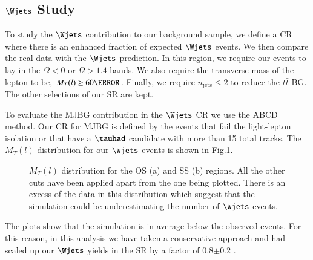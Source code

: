 \subsection{$\Wjets$ Study}\label{wjetsstudy}
To study the $\Wjets$ contribution to our background sample, we define a CR where there is an enhanced fraction of expected $\Wjets$ events. We then compare the real data with the  $\Wjets$ prediction. In this region, we require our events to lay in the $\Omega<0$ or $\Omega>1.4$ bands. We also require the transverse mass of the lepton to be, $M_T(l)\ge 60 \GeV$. Finally, we require $n_{\text{jets}}\le 2$ to reduce the $t\bar{t}$ BG. The other selections of our SR are kept.

To evaluate the MJBG contribution in the $\Wjets$ CR we use the ABCD method. Our CR for MJBG is defined by the events that fail the light-lepton isolation or that have a $\tauhad$ candidate with more than 15 total tracks. The  $M_T(l)$ distribution for our $\Wjets$ events is shown in Fig.\ref{Fig8}. 
\begin{figure}[htbp]
	\centering
	\hfill
	\caption{$M_T(l)$ distribution for the OS (a) and SS (b) regions. All the other cuts have been applied apart from the one being plotted. There is an excess of the data in this distribution which suggest that the simulation could be underestimating the number of $\Wjets$ events.}
	\label{Fig8}
\end{figure} 
The plots show that the simulation is in average below the observed events. For this reason, in this analysis we have taken a conservative approach and had scaled up our $\Wjets$ yields in the SR by a factor of 0.8$\pm$0.2 .
\clearpage
